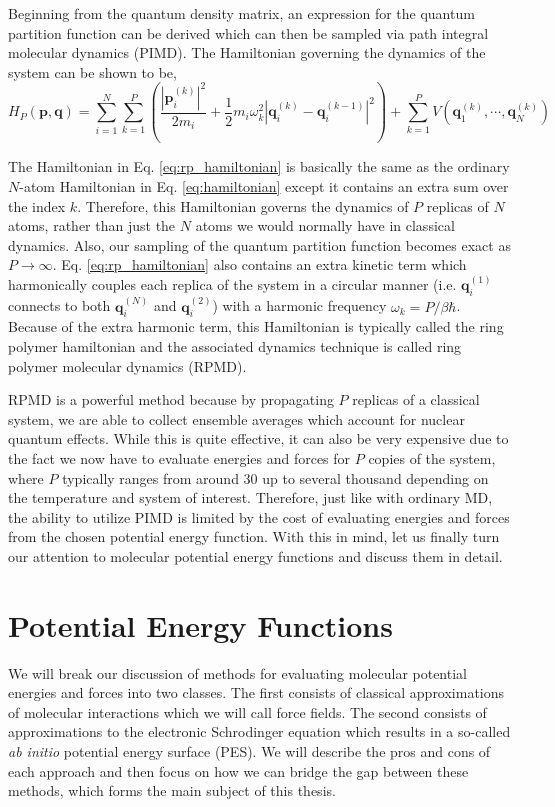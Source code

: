 \documentclass[11pt, proquest]{uwthesis}[2020/02/24]
\begin{document}
\par Beginning from the quantum density matrix, an expression for the quantum partition function can be derived which can then be sampled via path integral molecular dynamics (PIMD). The Hamiltonian governing the dynamics of the system can be shown to be\autocite{chandler_exploiting_1981},
\begin{equation}
    H_P(\mathbf{p}, \mathbf{q})=\sum_{i=1}^N\sum_{k=1}^P\left(\frac{|\mathbf{p}_i^{(k)}|^2}{2m_i}+\frac12m_i\omega_k^2|\mathbf{q}_i^{(k)}-\mathbf{q}_i^{(k-1)}|^2\right) + \sum_{k=1}^PV(\mathbf{q}_1^{(k)},\cdots,\mathbf{q}_N^{(k)})
    \label{eq:rp_hamiltonian}
\end{equation}

The Hamiltonian in Eq. \ref{eq:rp_hamiltonian} is basically the same as the ordinary $N$-atom Hamiltonian in Eq. \ref{eq:hamiltonian} except it contains an extra sum over the index $k$. Therefore, this Hamiltonian governs the dynamics of $P$ replicas of $N$ atoms, rather than just the $N$ atoms we would normally have in classical dynamics. Also, our sampling of the quantum partition function becomes exact as $P\rightarrow\infty$. Eq. \ref{eq:rp_hamiltonian} also contains an extra kinetic term which harmonically couples each replica of the system in a circular manner (i.e. $\mathbf{q}_i^{(1)}$ connects to both $\mathbf{q}_i^{(N)}$ and $\mathbf{q}_i^{(2)}$) with a harmonic frequency $\omega_k=P/\beta\hbar$. Because of the extra harmonic term, this Hamiltonian is typically called the ring polymer hamiltonian and the associated dynamics technique is called ring polymer molecular dynamics (RPMD).

RPMD is a powerful method because by propagating $P$ replicas of a classical system, we are able to collect ensemble averages which account for nuclear quantum effects. While this is quite effective, it can also be very expensive due to the fact we now have to evaluate energies and forces for $P$ copies of the system, where $P$ typically ranges from around 30 up to several thousand depending on the temperature and system of interest. Therefore, just like with ordinary MD, the ability to utilize PIMD is limited by the cost of evaluating energies and forces from the chosen potential energy function. With this in mind, let us finally turn our attention to molecular potential energy functions and discuss them in detail.

\section{Potential Energy Functions}
We will break our discussion of methods for evaluating molecular potential energies and forces into two classes. The first consists of classical approximations of molecular interactions which we will call force fields. The second consists of approximations to the electronic Schrodinger equation which results in a so-called \textit{ab initio} potential energy surface (PES). We will describe the pros and cons of each approach and then focus on how we can bridge the gap between these methods, which forms the main subject of this thesis.
\end{document}
